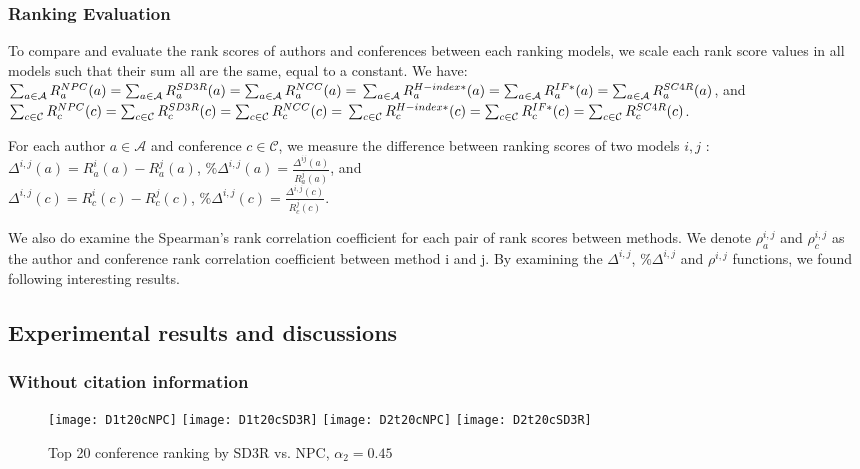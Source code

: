 \documentclass[10pt,leqno,twoside]{article}
\begin{document}
\subsubsection{Ranking Evaluation}
To compare and evaluate the rank scores of authors and conferences between each ranking models, we scale each rank score values in all models such that their sum all are the same, equal to a constant. We have:
\\
$\sum_{a \in \mathcal{A}} R^{NPC}_a(a) =
\sum_{a \in \mathcal{A}} R^{SD3R}_a(a) =
\sum_{a \in \mathcal{A}} R^{NCC}_a(a) =
\\
\sum_{a \in \mathcal{A}} R^{H-index*}_a(a) =
\sum_{a \in \mathcal{A}} R^{IF*}_a(a) =
\sum_{a \in \mathcal{A}} R^{SC4R}_a(a)$,
and
\\
$\sum_{c \in \mathcal{C}} R^{NPC}_c(c) =
\sum_{c \in \mathcal{C}} R^{SD3R}_c(c) =
\sum_{c \in \mathcal{C}} R^{NCC}_c(c) =
\\
\sum_{c \in \mathcal{C}} R^{H-index*}_c(c) =
\sum_{c \in \mathcal{C}} R^{IF*}_c(c) =
\sum_{c \in \mathcal{C}} R^{SC4R}_c(c) $.

For each author $a \in \mathcal{A}$ and conference $c\in \mathcal{C}$, we measure the difference between ranking scores of two models $i,j$ : 
\\
$\Delta^{i,j}(a)= R^i_a(a) - R^j_a(a)$, $\%\Delta^{i,j} (a)= \frac{\Delta^{ij}(a)}{R^j_a(a)}$, and 
\\
$\Delta^{i,j} (c)= R^i_c(c) - R^j_c(c)$, $\%\Delta ^{i,j}(c)= \frac{\Delta^{i,j}(c)}{R^j_c(c)}$.

We also do examine the Spearman's rank correlation coefficient for each pair of rank scores between methods. We denote $\rho^{i,j}_a$ and $\rho^{i,j}_c$ as the author and conference rank correlation coefficient between method i and j. By examining the $\Delta^{i,j}$, $\%\Delta^{i,j}$ and $\rho^{i,j}$ functions, we found following interesting results.

\subsection{Experimental results and discussions}\label{Sect:Result}

\subsubsection{Without citation information}
%
\begin{figure} %
	\caption{Top 20 conference ranking by SD3R vs. NPC, $\alpha_2=0.45$}
	\label{Fig:Top20Conference}
    \centering
    \texttt{[image: D1t20cNPC]}
    \texttt{[image: D1t20cSD3R]}
    \texttt{[image: D2t20cNPC]}
    \texttt{[image: D2t20cSD3R]}
\end{figure}
\end{document}
